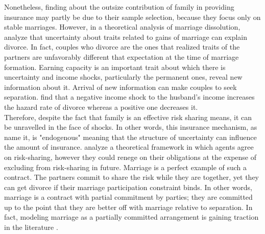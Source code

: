 Nonetheless, \citet{Blundell_etal_2015_Con-Ineq} finding about the outsize contribution of family in providing insurance
may partly be due to their sample selection, because they focus only on stable marriages. However, in a theoretical analysis of marriage dissolution, \citet{Becker_etal_1977} analyze that uncertainty about traits related to gains of marriage can explain divorce. In fact, couples who divorce are the ones that realized traits of the partners are unfavorably different that expectation at the time of marriage formation. Earning capacity is an important trait about which there is uncertainty and income shocks, particularly the permanent ones, reveal new information about it. Arrival of new information can make couples to seek separation. \citet{Weiss_Willis_1997} find that a negative income shock to the husband's income increases the hazard rate of divorce whereas a positive one decreases it.  \\

Therefore, despite the fact that family is an effective risk sharing means, it can be unravelled in the face of shocks. In other words, this insurance mechanism, as \citet{Krueger_Perri_2006_RES} name it, is "endogenous" meaning that the structure of uncertainty can influence the amount of insurance. \citet{Krueger_Perri_2006_RES} analyze a theoretical framework in which agents agree on risk-sharing, however they could renege on their obligations at the expense of excluding from risk-sharing in future. Marriage is a perfect example of such a contract. The partners commit to share the risk while they are together, yet they can get divorce if their marriage participation constraint binds. In other words, marriage is a contract with partial commitment by parties; they are committed up to the point that they are better off with marriage relative to separation. In fact, modeling marriage as a partially committed arrangement is gaining traction in the literature \cite{Chiappori_Mazzocco_2014; Mazzocco_Yamaguchi_2014}.  \\

